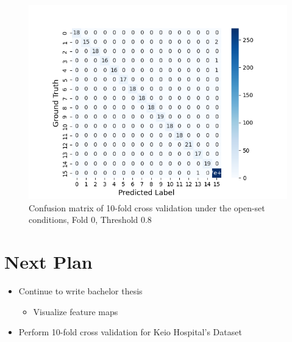 \documentclass[dvipdfmx]{article}
\begin{document}
\begin{figure}[H]
\begin{center}
\includegraphics[width=0.8\linewidth]{./img/cross_val_Fold0_threshold0.8.png}
\end{center}
\caption{Confusion matrix of 10-fold cross validation under the open-set conditions, Fold 0, Threshold 0.8}
\end{figure}

\section{Next Plan}
\begin{itemize}
    \item Continue to write bachelor thesis
    \begin{itemize}
        \item Visualize feature maps
    \end{itemize}
    \item Perform 10-fold cross validation for Keio Hospital's Dataset
\end{itemize}
\end{document}
